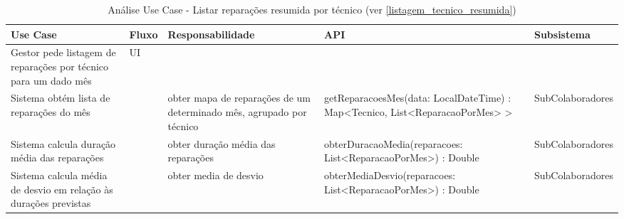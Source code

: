 \documentclass[../relatorio.tex]{subfiles}
\begin{document}
\begin{landscape}
    \begin{table}[!h]
        \centering
        \begin{tabular}{|p{5cm}|p{1cm}|p{4cm}|p{6cm}|p{4cm}|}
            \hline
            \rowcolor{gray!20!white}
            Use Case & Fluxo & Responsabilidade & API & Subsistema \\
            \hline
            \rowcolor{yellow}
            Gestor pede listagem de reparações por técnico para um dado mês %
                     & 
            UI
                     & 
                     & 
                     & 
            \\
            \hline
            Sistema obtém lista de reparações do mês
                     & 
                     & 
            obter mapa de reparações de um determinado mês, agrupado por técnico
                     & 
            getReparacoesMes(data: LocalDateTime) : Map<Tecnico, List<ReparacaoPorMes> >
                     & 
            SubColaboradores
            \\
            \hline
            Sistema calcula duração média das reparações
                     & 
                     & 
            obter duração média das reparações
                     & 
            obterDuracaoMedia(reparacoes: List<ReparacaoPorMes>) : Double
                     & 
            SubColaboradores
            \\
            \hline
            Sistema calcula média de desvio em relação às durações previstas
                     & 
                     & 
            obter media de desvio
                     & 
            obterMediaDesvio(reparacoes: List<ReparacaoPorMes>) : Double
                     & 
            SubColaboradores
            \\
            \hline
        \end{tabular}
        \caption{Análise Use Case - Listar reparações resumida por técnico (ver \ref{listagem_tecnico_resumida})}
    \end{table}
\end{landscape}
\end{document}
